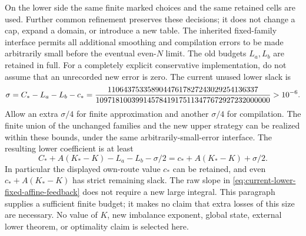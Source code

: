 On the lower side the same finite marked choices and the same retained
cells are used. Further common refinement preserves these decisions;
it does not change a cap, expand a domain, or introduce a new table.
The inherited fixed-family interface permits all additional smoothing
and compilation errors to be made arbitrarily small before the
eventual even-$N$ limit. The old budgets $L_a,L_b$ are retained in full.
For a completely explicit conservative implementation, do not assume
that an unrecorded new error is zero. The current unused lower slack is
\[
 \sigma=C_*-L_a-L_b-c_*
 ={11064375335890447617827243029254136337\over
 10971810039914578419175113477672927232000000}>10^{-6}.
\]
Allow an extra $\sigma/4$ for finite approximation and another
$\sigma/4$ for compilation. The finite union of the unchanged families
and the new upper strategy can be realized within these bounds, under
the same arbitrarily-small-error interface. The resulting lower
coefficient is at least
\[
 C_*+A(K_*-K)-L_a-L_b-\sigma/2
 =c_*+A(K_*-K)+\sigma/2.
\]
In particular the displayed own-route value $c_*$ can be retained, and
even $c_*+A(K_*-K)$ has strict remaining slack. The raw slope in
\eqref{eq:current-lower-fixed-affine-feedback} does not require a new
large integral. This paragraph supplies a sufficient finite budget;
it makes no claim that extra losses of this size are necessary.
No value of $K$, new imbalance exponent, global state, external lower
theorem, or optimality claim is selected here.
